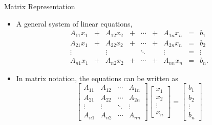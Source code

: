 \documentclass{beamer}
\begin{document}
\begin{frame}{Matrix Representation}
\begin{itemize}
\item A general system of linear equations, 
\begin{align*}
A_{11}x_1&+&A_{12}x_2 &+& \cdots & +& A_{1n}x_n&=&b_1\\
A_{21}x_1&+&A_{22}x_2 &+& \cdots & +& A_{2n}x_n&=&b_2\\
\vdots &&\vdots && \ddots & & \vdots &=&\vdots \\
A_{n1}x_1&+&A_{n2}x_2 &+& \cdots & +& A_{nn}x_n&=&b_n.
\end{align*} 
\item In matrix notation, the equations can be written as
\[
\left[ 
\begin{array}{cccc}
A_{11} & A_{12} & \cdots & A_{1n} \\
A_{21} & A_{22} & \cdots & A_{2n} \\
\vdots & \vdots & \ddots & \vdots \\
A_{n1} & A_{n2} & \cdots & A_{nn} 
\end{array}
\right]
\left[
\begin{array}{c}
x_1\\
x_2\\
\vdots\\
x_n
\end{array}
\right]
=
\left[
\begin{array}{c}
b_1\\
b_2\\
\vdots\\
b_n
\end{array}
\right]
\]
\end{itemize}
\end{frame}
\end{document}
